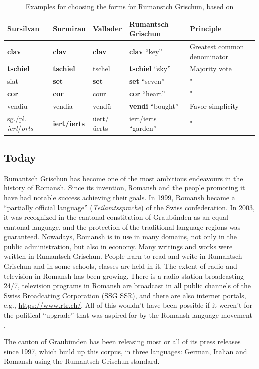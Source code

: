 \begin{table}
\centering
\begin{tabular}{lllll}
\toprule
Sursilvan & Surmiran & Vallader & Rumantsch Grischun & Principle \\
\midrule
\textbf{clav}	  &  \textbf{clav}    &  \textbf{clav}    & \textbf{clav}  \enquote{key}  & Greatest common denominator \\
\textbf{tschiel}       &   \textbf{tschiel}   & tschel      & \textbf{tschiel} \enquote{sky} & Majority vote \\
siat 	 & \textbf{set}      & \textbf{set}      & \textbf{set} \enquote{seven} & " \\
\textbf{cor} & \textbf{cor} & cour & \textbf{cor} \enquote{heart} & " \\
vendiu & vendia & vendü & \textbf{vendi} \enquote{bought} & Favor simplicity \\
sg./pl. \emph{iert}/\emph{orts} & \textbf{iert/ierts} & üert/üerts & iert/ierts \enquote{garden} & " \\
\bottomrule

\end{tabular}
\caption{Examples for choosing the forms for Rumanstch Grischun, based on \cite[70-71]{liver1999}}
\label{tab:rg-examples}
\end{table}


\subsection{Today}
Rumantsch Grischun has become one of the most ambitious endeavours in the history of Romansh. 
Since its invention, Romansh and the people promoting it have had notable success achieving their goals. 
In 1999, Romansh became a \enquote{partially official language} (\emph{Teilamtssprache}) of the Swiss confederation. 
In 2003, it was recognized in the cantonal constitution of Graubünden as an equal cantonal language, and the protection of the traditional language regions was guaranteed.
Nowadays, Romansh is in use in many domains, not only in the public administration, but also in economy. 
Many writings and works were written in Rumantsch Grischun. 
People learn to read and write in Rumantsch Grischun and in some schools, classes are held in it. 
The extent of radio and television in Romansh has been growing. 
There is a radio station broadcasting 24/7, television programs in Romansh are broadcast in all public channels of the Swiss Broadcating Corporation (SSG SSR), and there are also internet portals, e.g., \url{https://www.rtr.ch/}. All of this wouldn't have been possible if it weren't for the political \enquote{upgrade} that was aspired for by the Romansh language movement \autocite{cathomas2012}.

The canton of Graubünden has been releasing most or all of its press releases since 1997, which build up this corpus, in three languages: German, Italian and Romansh using the Rumantsch Grischun standard.